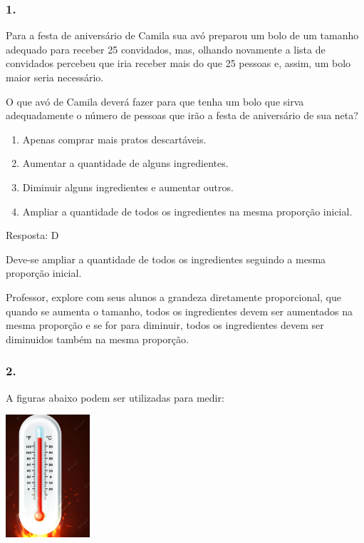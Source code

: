 \subsubsection{1.}\label{section-117}

Para a festa de aniversário de Camila sua avó preparou um bolo de um
tamanho adequado para receber 25 convidados, mas, olhando novamente a
lista de convidados percebeu que iria receber mais do que 25 pessoas e,
assim, um bolo maior seria necessário.

O que avó de Camila deverá fazer para que tenha um bolo que sirva
adequadamente o número de pessoas que irão a festa de aniversário de sua
neta?

\begin{enumerate}
\def\labelenumi{\alph{enumi})}
\item
  Apenas comprar mais pratos descartáveis.
\item
  Aumentar a quantidade de alguns ingredientes.
\item
  Diminuir alguns ingredientes e aumentar outros.
\item
  Ampliar a quantidade de todos os ingredientes na mesma proporção
  inicial.
\end{enumerate}

Resposta: D

Deve-se ampliar a quantidade de todos os ingredientes seguindo a mesma
proporção inicial.

Professor, explore com seus alunos a grandeza diretamente proporcional,
que quando se aumenta o tamanho, todos os ingredientes devem ser
aumentados na mesma proporção e se for para diminuir, todos os
ingredientes devem ser diminuidos também na mesma proporção.

\subsubsection{2. }\label{section-118}

A figuras abaixo podem ser utilizadas para medir:

\includegraphics[width=1.22500in,height=1.79354in]{media/image128.png}

